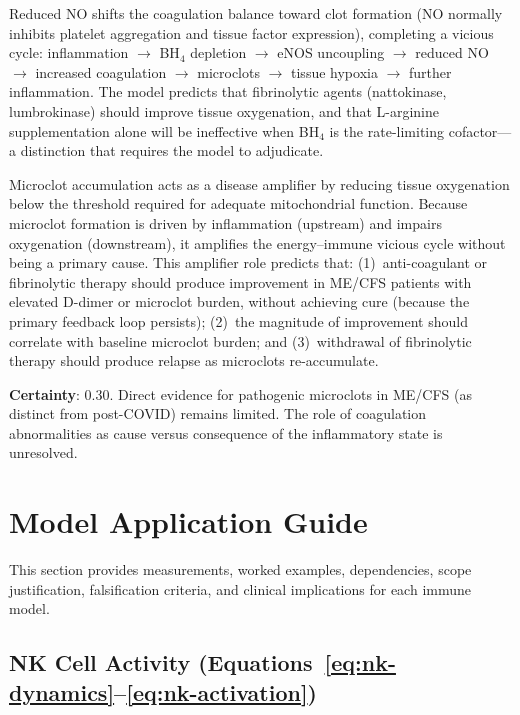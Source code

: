 Reduced NO shifts the coagulation balance toward clot formation (NO normally inhibits platelet aggregation and tissue factor expression), completing a vicious cycle: inflammation $\to$ BH$_4$ depletion $\to$ eNOS uncoupling $\to$ reduced NO $\to$ increased coagulation $\to$ microclots $\to$ tissue hypoxia $\to$ further inflammation. The model predicts that fibrinolytic agents (nattokinase, lumbrokinase) should improve tissue oxygenation, and that L-arginine supplementation alone will be ineffective when BH$_4$ is the rate-limiting cofactor---a distinction that requires the model to adjudicate.

\begin{speculation}
Microclot accumulation acts as a disease amplifier by reducing tissue oxygenation below the threshold required for adequate mitochondrial function. Because microclot formation is driven by inflammation (upstream) and impairs oxygenation (downstream), it amplifies the energy--immune vicious cycle without being a primary cause. This amplifier role predicts that: (1)~anti-coagulant or fibrinolytic therapy should produce improvement in ME/CFS patients with elevated D-dimer or microclot burden, without achieving cure (because the primary feedback loop persists); (2)~the magnitude of improvement should correlate with baseline microclot burden; and (3)~withdrawal of fibrinolytic therapy should produce relapse as microclots re-accumulate.

\textbf{Certainty}: 0.30. Direct evidence for pathogenic microclots in ME/CFS (as distinct from post-COVID) remains limited. The role of coagulation abnormalities as cause versus consequence of the inflammatory state is unresolved.
\end{speculation}

\section{Model Application Guide}
\label{sec:immune-model-application}

This section provides measurements, worked examples, dependencies, scope justification, falsification criteria, and clinical implications for each immune model.

\subsection{NK Cell Activity (Equations~\ref{eq:nk-dynamics}--\ref{eq:nk-activation})}

